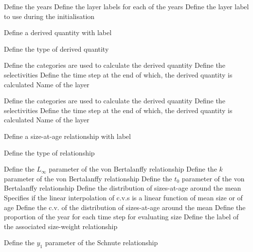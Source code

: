 \par\textbf{}\par
{} {Define the years}
 {Define the layer labels for each of the years}
 {Define the layer label to use during the initialisation}
\par{} {Define a derived quantity with label}\par
{} {Define the type of derived quantity}
\par\textbf{}\par
{} {Define the categories are used to calculate the derived quantity}
 {Define the selectivities}
 {Define the time step at the end of which, the derived quantity is calculated}
 {Name of the layer}
\par\textbf{}\par
{} {Define the categories are used to calculate the derived quantity}
 {Define the selectivities}
 {Define the time step at the end of which, the derived quantity is calculated}
 {Name of the layer}
\par{} {Define a size-at-age relationship with label}\par
{} {Define the type of relationship}
\par\textbf{}\par
{} {Define the $L_\infty$ parameter of the von Bertalanffy relationship}
 {Define the $k$ parameter of the von Bertalanffy relationship}
 {Define the $t_0$ parameter of the von Bertalanffy relationship}
 {Define the distribution of sizes-at-age around the mean}
 {Specifies if the linear interpolation of c.v.s is a linear function of mean size or of age}
 {Define the c.v. of the distribution of sizes-at-age around the mean}
 {Define the proportion of the year for each time step for evaluating size}
 {Define the label of the associated size-weight relationship}
\par\textbf{}\par
{} {Define the $y_1$ parameter of the Schnute relationship}
